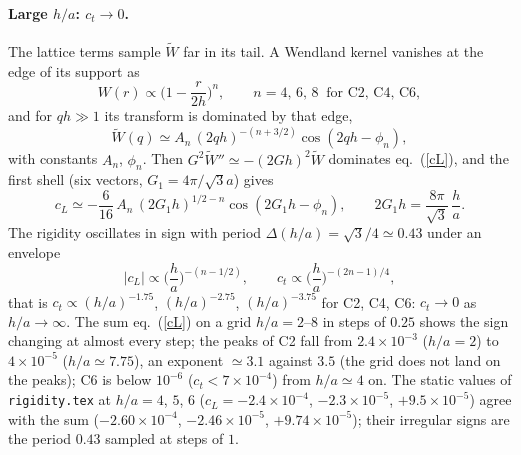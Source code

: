 \documentclass[11pt,aps,preprint,nofootinbib,superscriptaddress,tightenlines]{revtex4-2}
\def\st{\begin{equation}}
\def\stp{\end{equation}}
\def\Eq#1{eq.~(\ref{#1})}
\let\oldparagraph\paragraph
\renewcommand{\paragraph}{\par\bigskip\oldparagraph}
\begin{document}
\paragraph{Large $h/a$: $c_t\to0$.}  The lattice terms sample $\tilde W$ far in its tail.  A
Wendland kernel vanishes at the edge of its support as
\st
W(r)\propto\Big(1-\frac r{2h}\Big)^{n},\qquad n=4,\,6,\,8\ \text{ for C2, C4, C6},
\stp
and for $qh\gg1$ its transform is dominated by that edge,
\st
\tilde W(q)\simeq A_n\,(2qh)^{-(n+3/2)}\cos(2qh-\phi_n),
\stp
with constants $A_n$, $\phi_n$.  Then $G^2\tilde W''\simeq-(2Gh)^2\tilde W$ dominates \Eq{cL}, and
the first shell (six vectors, $G_1=4\pi/\sqrt3a$) gives
\st
c_L\simeq-\frac{6}{16}\,A_n\,(2G_1h)^{1/2-n}\cos(2G_1h-\phi_n),\qquad
2G_1h=\frac{8\pi}{\sqrt3}\,\frac ha .
\label{cLasym}
\stp
The rigidity oscillates in sign with period $\Delta(h/a)=\sqrt3/4\simeq0.43$ under an envelope
\st
|c_L|\propto\Big(\frac ha\Big)^{-(n-1/2)},\qquad
c_t\propto\Big(\frac ha\Big)^{-(2n-1)/4} ,
\stp
that is $c_t\propto(h/a)^{-1.75}$, $(h/a)^{-2.75}$, $(h/a)^{-3.75}$ for C2, C4, C6: $c_t\to0$ as
$h/a\to\infty$.  The sum \Eq{cL} on a grid $h/a=2$--$8$ in steps of $0.25$ shows the sign
changing at almost every step; the peaks of C2 fall from $2.4\times10^{-3}$ ($h/a=2$) to
$4\times10^{-5}$ ($h/a\simeq7.75$), an exponent $\simeq3.1$ against $3.5$ (the grid does not land
on the peaks); C6 is below $10^{-6}$ ($c_t<7\times10^{-4}$) from $h/a\simeq4$ on.  The static
values of \texttt{rigidity.tex} at $h/a=4$, $5$, $6$ ($c_L=-2.4\times10^{-4}$, $-2.3\times10^{-5}$,
$+9.5\times10^{-5}$) agree with the sum ($-2.60\times10^{-4}$, $-2.46\times10^{-5}$,
$+9.74\times10^{-5}$); their irregular signs are the period $0.43$ sampled at steps of $1$.
\end{document}
